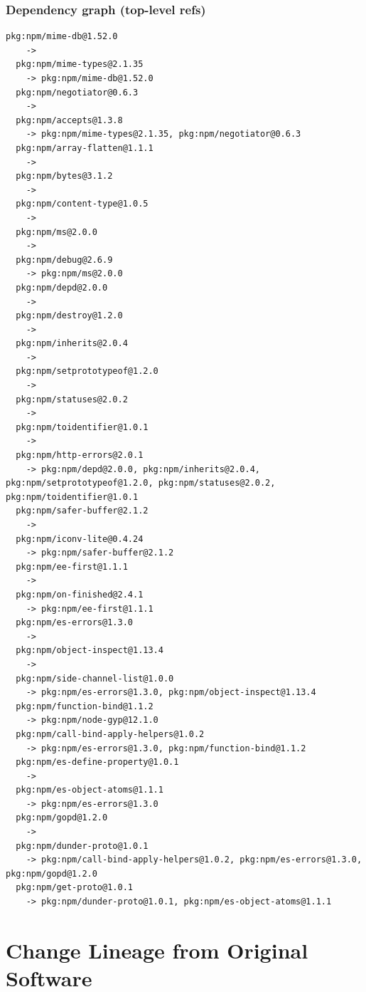 \documentclass[11pt,a4paper]{article}
\begin{document}
\subsubsection*{Dependency graph (top-level refs)}
\begin{lstlisting}[style=depgraph]
  pkg:npm/mime-db@1.52.0
    -> 
  pkg:npm/mime-types@2.1.35
    -> pkg:npm/mime-db@1.52.0
  pkg:npm/negotiator@0.6.3
    -> 
  pkg:npm/accepts@1.3.8
    -> pkg:npm/mime-types@2.1.35, pkg:npm/negotiator@0.6.3
  pkg:npm/array-flatten@1.1.1
    -> 
  pkg:npm/bytes@3.1.2
    -> 
  pkg:npm/content-type@1.0.5
    -> 
  pkg:npm/ms@2.0.0
    -> 
  pkg:npm/debug@2.6.9
    -> pkg:npm/ms@2.0.0
  pkg:npm/depd@2.0.0
    -> 
  pkg:npm/destroy@1.2.0
    -> 
  pkg:npm/inherits@2.0.4
    -> 
  pkg:npm/setprototypeof@1.2.0
    -> 
  pkg:npm/statuses@2.0.2
    -> 
  pkg:npm/toidentifier@1.0.1
    -> 
  pkg:npm/http-errors@2.0.1
    -> pkg:npm/depd@2.0.0, pkg:npm/inherits@2.0.4, pkg:npm/setprototypeof@1.2.0, pkg:npm/statuses@2.0.2, pkg:npm/toidentifier@1.0.1
  pkg:npm/safer-buffer@2.1.2
    -> 
  pkg:npm/iconv-lite@0.4.24
    -> pkg:npm/safer-buffer@2.1.2
  pkg:npm/ee-first@1.1.1
    -> 
  pkg:npm/on-finished@2.4.1
    -> pkg:npm/ee-first@1.1.1
  pkg:npm/es-errors@1.3.0
    -> 
  pkg:npm/object-inspect@1.13.4
    -> 
  pkg:npm/side-channel-list@1.0.0
    -> pkg:npm/es-errors@1.3.0, pkg:npm/object-inspect@1.13.4
  pkg:npm/function-bind@1.1.2
    -> pkg:npm/node-gyp@12.1.0
  pkg:npm/call-bind-apply-helpers@1.0.2
    -> pkg:npm/es-errors@1.3.0, pkg:npm/function-bind@1.1.2
  pkg:npm/es-define-property@1.0.1
    -> 
  pkg:npm/es-object-atoms@1.1.1
    -> pkg:npm/es-errors@1.3.0
  pkg:npm/gopd@1.2.0
    -> 
  pkg:npm/dunder-proto@1.0.1
    -> pkg:npm/call-bind-apply-helpers@1.0.2, pkg:npm/es-errors@1.3.0, pkg:npm/gopd@1.2.0
  pkg:npm/get-proto@1.0.1
    -> pkg:npm/dunder-proto@1.0.1, pkg:npm/es-object-atoms@1.1.1
\end{lstlisting}

\newpage
\section{Change Lineage from Original Software}
\end{document}
